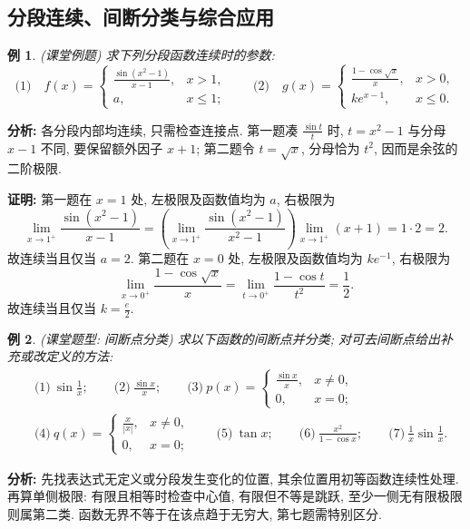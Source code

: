 \documentclass[UTF8,openany]{ctexbook}
\theoremstyle{chinesetextbook}
\newtheorem{example}{例}[section]
\newenvironment{cnproof}{\par\indent\textbf{证明:} \ignorespaces}{\par}
\begin{document}
\subsection{分段连续、间断分类与综合应用}
\begin{example}
(课堂例题) 求下列分段函数连续时的参数:
\[
\text{(1)}\quad f(x)=\begin{cases}\frac{\sin(x^2-1)}{x-1},&x>1,\\a,&x\le1;\end{cases}
\qquad
\text{(2)}\quad g(x)=\begin{cases}\frac{1-\cos\sqrt x}{x},&x>0,\\ke^{x-1},&x\le0.\end{cases}
\]
\end{example}
\par\indent\textbf{分析:} 各分段内部均连续, 只需检查连接点. 第一题凑 $\displaystyle\frac{\sin t}t$ 时, $t=x^2-1$ 与分母 $x-1$ 不同, 要保留额外因子 $x+1$; 第二题令 $t=\sqrt x$, 分母恰为 $t^2$, 因而是余弦的二阶极限.
\begin{cnproof}
第一题在 $x=1$ 处, 左极限及函数值均为 $a$, 右极限为
\[
\lim_{x\to1^+}\frac{\sin(x^2-1)}{x-1}
=\left(\lim_{x\to1^+}\frac{\sin(x^2-1)}{x^2-1}\right)\lim_{x\to1^+}(x+1)
=1\cdot2=2.
\]
故连续当且仅当 $a=2$. 第二题在 $x=0$ 处, 左极限及函数值均为 $ke^{-1}$, 右极限为
\[
\lim_{x\to0^+}\frac{1-\cos\sqrt x}x=\lim_{t\to0^+}\frac{1-\cos t}{t^2}=\frac12.
\]
故连续当且仅当 $\displaystyle k=\frac e2$.
\end{cnproof}
\begin{example}
(课堂题型: 间断点分类) 求以下函数的间断点并分类; 对可去间断点给出补充或改定义的方法:
\[
\begin{aligned}
&\text{(1)}\ \sin\frac1x;\qquad
\text{(2)}\ \frac{\sin x}{x};\qquad
\text{(3)}\ p(x)=\begin{cases}\frac{\sin x}{x},&x\ne0,\\0,&x=0;\end{cases}\\
&\text{(4)}\ q(x)=\begin{cases}\frac{x}{|x|},&x\ne0,\\0,&x=0;\end{cases}\qquad
\text{(5)}\ \tan x;\qquad
\text{(6)}\ \frac{x^2}{1-\cos x};\qquad
\text{(7)}\ \frac1x\sin\frac1x.
\end{aligned}
\]
\end{example}
\par\indent\textbf{分析:} 先找表达式无定义或分段发生变化的位置, 其余位置用初等函数连续性处理. 再算单侧极限: 有限且相等时检查中心值, 有限但不等是跳跃, 至少一侧无有限极限则属第二类. 函数无界不等于在该点趋于无穷大, 第七题需特别区分.
\end{document}
